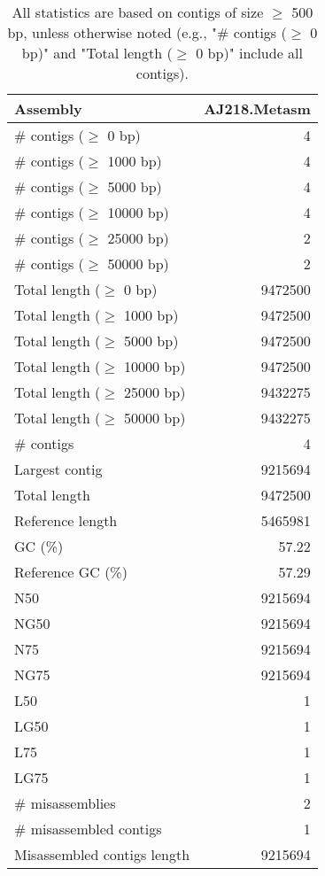 \documentclass[12pt,a4paper]{article}
\begin{document}
\begin{table}[ht]
\begin{center}
\caption{All statistics are based on contigs of size $\geq$ 500 bp, unless otherwise noted (e.g., "\# contigs ($\geq$ 0 bp)" and "Total length ($\geq$ 0 bp)" include all contigs).}
\begin{tabular}{|l*{1}{|r}|}
\hline
Assembly & AJ218.Metasm \\ \hline
\# contigs ($\geq$ 0 bp) & 4 \\ \hline
\# contigs ($\geq$ 1000 bp) & 4 \\ \hline
\# contigs ($\geq$ 5000 bp) & 4 \\ \hline
\# contigs ($\geq$ 10000 bp) & 4 \\ \hline
\# contigs ($\geq$ 25000 bp) & 2 \\ \hline
\# contigs ($\geq$ 50000 bp) & 2 \\ \hline
Total length ($\geq$ 0 bp) & 9472500 \\ \hline
Total length ($\geq$ 1000 bp) & 9472500 \\ \hline
Total length ($\geq$ 5000 bp) & 9472500 \\ \hline
Total length ($\geq$ 10000 bp) & 9472500 \\ \hline
Total length ($\geq$ 25000 bp) & 9432275 \\ \hline
Total length ($\geq$ 50000 bp) & 9432275 \\ \hline
\# contigs & 4 \\ \hline
Largest contig & 9215694 \\ \hline
Total length & 9472500 \\ \hline
Reference length & 5465981 \\ \hline
GC (\%) & 57.22 \\ \hline
Reference GC (\%) & 57.29 \\ \hline
N50 & 9215694 \\ \hline
NG50 & 9215694 \\ \hline
N75 & 9215694 \\ \hline
NG75 & 9215694 \\ \hline
L50 & 1 \\ \hline
LG50 & 1 \\ \hline
L75 & 1 \\ \hline
LG75 & 1 \\ \hline
\# misassemblies & 2 \\ \hline
\# misassembled contigs & 1 \\ \hline
Misassembled contigs length & 9215694 \\ \hline

\end{tabular}
\end{center}
\end{table}
\end{document}
